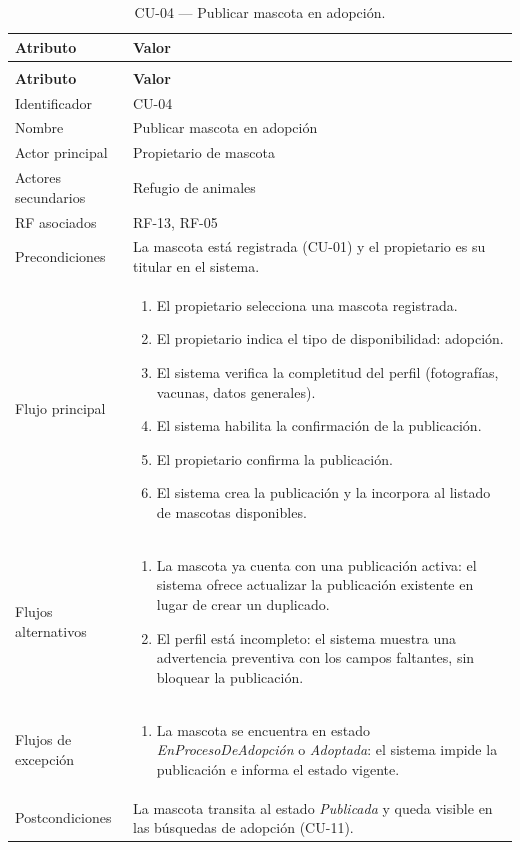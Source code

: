\documentclass[journal,onecolumn]{IEEEtran}
\makeatletter
\newenvironment{atributos}[2]{%
	\small
	\begin{longtable}{@{}>{\raggedright\arraybackslash}p{4.2cm} >{\raggedright\arraybackslash}p{11.2cm}@{}}
		\caption{#2}\label{tab:#1}\\
		\toprule
		\textbf{Atributo} & \textbf{Valor} \\
		\midrule
		\endfirsthead
		\multicolumn{2}{@{}l}{\small\itshape (continuación)}\\
		\toprule
		\textbf{Atributo} & \textbf{Valor} \\
		\midrule
		\endhead
		\bottomrule
		\endlastfoot
	}{%
	\end{longtable}
	\normalsize
}
\makeatother
\begin{document}
	\begin{atributos}{CU-04}{CU-04 --- Publicar mascota en adopción.}
		Identificador & CU-04 \\
		Nombre & Publicar mascota en adopción \\
		Actor principal & Propietario de mascota \\
		Actores secundarios & Refugio de animales \\
		RF asociados & RF-13, RF-05 \\
		Precondiciones & La mascota está registrada (CU-01) y el propietario es su titular en el sistema. \\
		Flujo principal &
		\begin{enumerate}[leftmargin=*, nosep]
			\item El propietario selecciona una mascota registrada.
			\item El propietario indica el tipo de disponibilidad: adopción.
			\item El sistema verifica la completitud del perfil (fotografías, vacunas, datos generales).
			\item El sistema habilita la confirmación de la publicación.
			\item El propietario confirma la publicación.
			\item El sistema crea la publicación y la incorpora al listado de mascotas disponibles.
		\end{enumerate} \\
		Flujos alternativos &
		\begin{enumerate}[leftmargin=*, nosep]
			\item[1.1] La mascota ya cuenta con una publicación activa: el sistema ofrece actualizar la publicación existente en lugar de crear un duplicado.
			\item[3.1] El perfil está incompleto: el sistema muestra una advertencia preventiva con los campos faltantes, sin bloquear la publicación.
		\end{enumerate} \\
		Flujos de excepción &
		\begin{enumerate}[leftmargin=*, nosep]
			\item[6.1] La mascota se encuentra en estado \emph{EnProcesoDeAdopción} o \emph{Adoptada}: el sistema impide la publicación e informa el estado vigente.
		\end{enumerate} \\
		Postcondiciones & La mascota transita al estado \emph{Publicada} y queda visible en las búsquedas de adopción (CU-11). \\
	\end{atributos}
	
\end{document}
